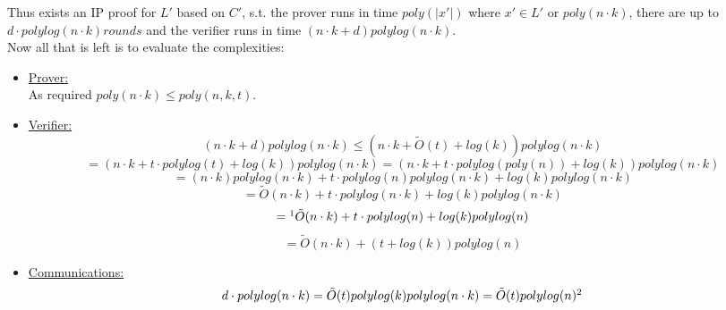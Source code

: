 Thus exists an IP proof for $L'$ based on $C'$,
s.t. the prover runs in time $poly(|x'|)$ where $x'\in L'$
or $poly(n\cdot k)$, there
are up to $d\cdot polylog(n\cdot k) rounds$ and the verifier
runs in time $(n\cdot k+d)polylog(n\cdot k)$.\\
Now all that is left is to evaluate the complexities:
\begin{itemize}
	\item \underline{Prover:}\\
		As required $poly(n\cdot k)\leq poly(n,k,t)$.
	\item \underline{Verifier:}\\
	\[
		(n\cdot k+d)polylog(n\cdot k)
		\leq (n\cdot k+\tilde{O}(t)+log(k))polylog(n\cdot k)
	\]\[
		= (n\cdot k+t\cdot polylog(t)+log(k))polylog(n\cdot k)
		= (n\cdot k+t\cdot polylog(poly(n))+log(k))polylog(n\cdot k)
	\]\[
		= (n\cdot k)polylog(n\cdot k)+t\cdot polylog(n)polylog(n\cdot k)+log(k)polylog(n\cdot k)
	\]\[
		= \tilde{O}(n\cdot k)+t\cdot polylog(n\cdot k)+log(k)polylog(n\cdot k)
	\]\[	
		=\footnote{
		$
			polylog(n\cdot k)=polylog(n\cdot poly(n))=
			poly(log(n\cdot n^c))=poly((c+1)log(n))=polylog(n)
		$	
		}
		\tilde{O}(n\cdot k)+t\cdot polylog(n)+log(k)polylog(n)
	\]\[
		=\tilde{O}(n\cdot k)+(t+log(k))polylog(n)
	\]
	\item \underline{Communications:}\\
	\[
		d\cdot polylog(n\cdot k)
		= \tilde{O}(t)polylog(k)polylog(n\cdot k)
		= \tilde{O}(t)polylog(n)\footnote{
			is the same as $(log(k)+t)polylog(n)$.
		}
		\]
\end{itemize}
